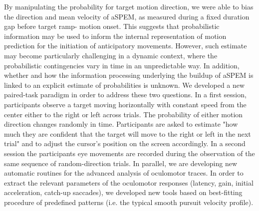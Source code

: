 \documentclass[profile,final,english, draft]{article}%
\begin{document}
By manipulating the probability for target motion direction, we were able to bias the direction and mean velocity of aSPEM, as measured during a fixed duration gap before target ramp- motion onset. This suggests that probabilistic information may be used to inform the internal representation of motion prediction for the initiation of anticipatory movements. However, such estimate may become particularly challenging in a dynamic context, where the probabilistic contingencies vary in time in an unpredictable way. In addition, whether and how the information processing underlying the buildup of aSPEM is linked to an explicit estimate of probabilities is unknown. We developed a new paired-task paradigm in order to address these two questions. In a first session, participants observe a target moving horizontally with constant speed from the center either to the right or left across trials. The probability of either motion direction changes randomly in time. Participants are asked to estimate "how much they are confident that the target will move to the right or left in the next trial" and to adjust the cursor's position on the screen accordingly. In a second session the participants eye movements are recorded during the observation of the same sequence of random-direction trials.
In parallel, we are developing new automatic routines for the advanced analysis of oculomotor traces. In order to extract the relevant parameters of the oculomotor responses (latency, gain, initial acceleration, catch-up saccades), we developed new tools based on best-fitting procedure of predefined patterns (i.e. the typical smooth pursuit velocity profile).
\end{document}
